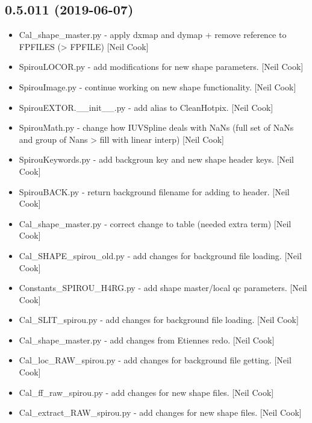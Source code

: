 \documentclass[a4paper,10pt,english]{report}
\begin{document}
\subsection{0.5.011 (2019-06-07)}
\label{\detokenize{misc/changelog:id124}}\begin{itemize}
\item {} 
Cal\_shape\_master.py - apply dxmap and dymap + remove reference to
FPFILES (\textendash{}\textgreater{} FPFILE) {[}Neil Cook{]}

\item {} 
SpirouLOCOR.py - add modifications for new shape parameters. {[}Neil
Cook{]}

\item {} 
SpirouImage.py - continue working on new shape functionality. {[}Neil
Cook{]}

\item {} 
SpirouEXTOR.\_\_init\_\_.py - add alias to CleanHotpix. {[}Neil Cook{]}

\item {} 
SpirouMath.py - change how IUVSpline deals with NaNs (full set of NaNs
and group of Nans \textendash{}\textgreater{} fill with linear interp) {[}Neil Cook{]}

\item {} 
SpirouKeywords.py - add backgroun key and new shape header keys. {[}Neil
Cook{]}

\item {} 
SpirouBACK.py - return background filename for adding to header. {[}Neil
Cook{]}

\item {} 
Cal\_shape\_master.py - correct change to table (needed extra term)
{[}Neil Cook{]}

\item {} 
Cal\_SHAPE\_spirou\_old.py - add changes for background file loading.
{[}Neil Cook{]}

\item {} 
Constants\_SPIROU\_H4RG.py - add shape master/local qc parameters. {[}Neil
Cook{]}

\item {} 
Cal\_SLIT\_spirou.py - add changes for background file loading. {[}Neil
Cook{]}

\item {} 
Cal\_shape\_master.py - add changes from Etiennes redo. {[}Neil Cook{]}

\item {} 
Cal\_loc\_RAW\_spirou.py - add changes for background file getting. {[}Neil
Cook{]}

\item {} 
Cal\_ff\_raw\_spirou.py - add changes for new shape files. {[}Neil Cook{]}

\item {} 
Cal\_extract\_RAW\_spirou.py - add changes for new shape files. {[}Neil
Cook{]}

\end{itemize}
\end{document}
